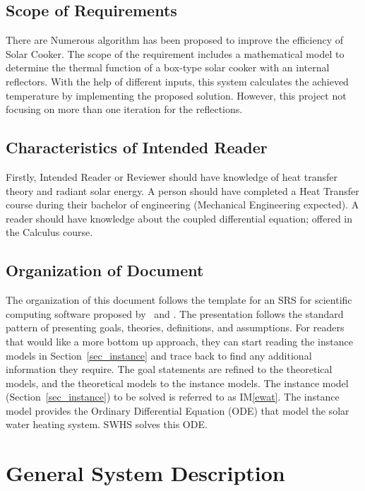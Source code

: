 \documentclass[12pt]{article}
\newcommand{\iref}[1]{IM\ref{#1}}
\begin{document}
\subsection{Scope of Requirements} 

There are Numerous algorithm has been proposed to improve the efficiency of Solar Cooker. The scope of the requirement includes a mathematical model to determine the thermal function of a box-type solar cooker with an internal reflectors. With the help of different inputs, this system calculates the achieved temperature by implementing the proposed solution. However, this project not focusing on more than one iteration for the reflections. 

\subsection{Characteristics of Intended Reader} \label{sec_IntendedReader}

Firstly, Intended Reader or Reviewer should have knowledge of heat transfer theory and radiant solar energy. A person should have completed a Heat Transfer course during their bachelor of engineering (Mechanical Engineering expected). A reader should have knowledge about the coupled differential equation; offered in the Calculus course.        

\subsection{Organization of Document}

The organization of this document follows the template for an SRS for scientific 
computing software proposed by~\cite{Koothoor2013} and \cite{SmithAndLai2005}.
The presentation follows the standard pattern of presenting goals, theories, definitions, 
and assumptions. For readers that would like a more bottom up approach, they can start 
reading the instance models in Section~\ref{sec_instance} and trace back to find any 
additional information they require. The goal statements are refined to the theoretical models, 
and the theoretical models to the instance models. The instance model 
(Section~\ref{sec_instance}) to be solved is referred to as \iref{ewat}. The instance model provides 
the Ordinary Differential Equation (ODE) that model the solar water heating system. 
SWHS solves this ODE.

\section{General System Description}
\end{document}
